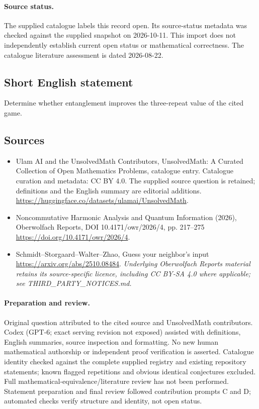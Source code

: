 \documentclass[11pt]{article}
\begin{document}
\paragraph{Source status.}
The supplied catalogue labels this record open. Its source-status metadata was checked against the supplied snapshot on 2026-10-11. This import does not independently establish current open status or mathematical correctness. The catalogue literature assessment is dated 2026-08-22.
\subsection{Short English statement}
Determine whether entanglement improves the three-repeat value of the cited game.
\subsection{Sources}
\begin{itemize}
\item[S1] Ulam AI and the UnsolvedMath Contributors, UnsolvedMath: A Curated Collection of Open Mathematics Problems, catalogue entry. Catalogue curation and metadata: CC BY 4.0. The supplied source question is retained; definitions and the English summary are editorial additions.
\url{https://huggingface.co/datasets/ulamai/UnsolvedMath}.
\item[S2] Noncommutative Harmonic Analysis and Quantum Information (2026), Oberwolfach Reports, DOI 10.4171/owr/2026/4, pp. 217--275
\url{https://doi.org/10.4171/owr/2026/4}.
\item[S3] Schmidt--Storgaard--Walter--Zhao, Guess your neighbor's input
\url{https://arxiv.org/abs/2510.08484}.
\textit{Underlying Oberwolfach Reports material retains its source-specific licence, including CC BY-SA 4.0 where applicable; see THIRD\_PARTY\_NOTICES.md.}
\end{itemize}
\paragraph{Preparation and review.}
Original question attributed to the cited source and UnsolvedMath contributors. Codex (GPT-6; exact serving revision not exposed) assisted with definitions, English summaries, source inspection and formatting. No new human mathematical authorship or independent proof verification is asserted. Catalogue identity checked against the complete supplied registry and existing repository statements; known flagged repetitions and obvious identical conjectures excluded. Full mathematical-equivalence/literature review has not been performed. Statement preparation and final review followed contribution prompts C and D; automated checks verify structure and identity, not open status.
\label{end:statement}
\end{document}
